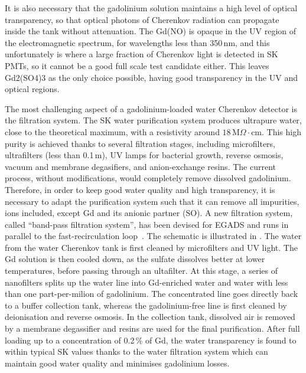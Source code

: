 It is also necessary that the gadolinium solution maintains a high level of optical transparency, %
so that optical photons of Cherenkov radiation can propagate inside the tank without attenuation.
The Gd(NO) is opaque in the UV region of the electromagnetic spectrum, for wavelengths less than 350\,nm, %
and this unfortunately is where a large fraction of Cherenkov light is detected in SK PMTs, %
so it cannot be a good full scale test candidate either.
This leaves Gd2(SO4)3 as the only choice possible, having good transparency in the UV and optical regions.

The most challenging aspect of a gadolinium-loaded water Cherenkov detector is the filtration system.
The SK water purification system produces ultrapure water, close to the theoretical maximum, %
with a resistivity around $18$\,M$\Omega\cdot$cm.
This high purity is achieved thanks to several filtration stages, including microfilters, %
ultrafilters (less than 0.1\,\textmu m), UV lamps for bacterial growth, reverse osmosis,  vacuum and membrane degasifiers, and anion-exchange resins.
The current process, without modifications, would completely remove dissolved gadolinium.
Therefore, in order to keep good water quality and high transparency, it is necessary to adapt the purification system %
such that it can remove all impurities, ions included, except Gd and its anionic partner (SO).
A new filtration system, called ``band-pass filtration system'', has been devised for EGADS and runs in parallel to %
the fast-recirculation loop~\cite{Ikeda:2019pcm}.
The schematic is illustrated in .
The water from the water Cherenkov tank is first cleaned by microfilters and UV light.
The Gd solution is then cooled down, as the sulfate dissolves better at lower temperatures, %
before passing through an ultafilter.
At this stage, a series of nanofilters splits up the water line into Gd-enriched water and %
water with less than one part-per-milion of gadolinium.
The concentrated line goes directly back to a buffer collection tank, whereas the gadolinium-free line %
is first cleaned by deionisation and reverse osmosis.
In the collection tank, dissolved air is removed by a membrane degassifier and resins are used %
for the final purification.
After full loading up to a concentration of 0.2\,\% of Gd, the water transparency is found to within typical SK values %
thanks to the water filtration system which can maintain good water quality and minimises gadolinium losses.

